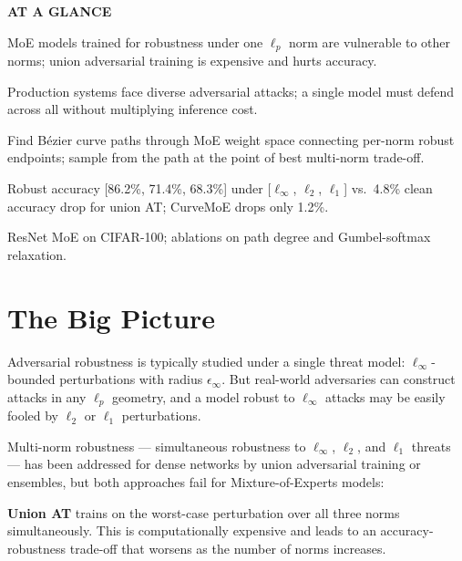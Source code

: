 \documentclass[10pt,twocolumn]{article}
\begin{document}
\begin{mdframed}[backgroundcolor=boxgray,linecolor=rulered,linewidth=1pt,
    innerleftmargin=6pt,innerrightmargin=6pt,
    innertopmargin=6pt,innerbottommargin=6pt]
\textbf{\small AT A GLANCE}\par\vspace{4pt}
\begin{description}[leftmargin=0pt,labelsep=4pt,itemsep=2pt,parsep=0pt,
    font=\small\bfseries]
  \item[Problem:] MoE models trained for robustness under one $\ell_p$
    norm are vulnerable to other norms; union adversarial training is
    expensive and hurts accuracy.
  \item[Why it matters:] Production systems face diverse adversarial
    attacks; a single model must defend across all without multiplying
    inference cost.
  \item[Method:] Find Bézier curve paths through MoE weight space
    connecting per-norm robust endpoints; sample from the path at the
    point of best multi-norm trade-off.
  \item[Result:] Robust accuracy [86.2\%, 71.4\%, 68.3\%] under
    [$\ell_\infty$, $\ell_2$, $\ell_1$] vs.\ 4.8\% clean accuracy drop
    for union AT; CurveMoE drops only 1.2\%.
  \item[Evidence:] ResNet MoE on CIFAR-100; ablations on path degree
    and Gumbel-softmax relaxation.
\end{description}
\end{mdframed}

\section{The Big Picture}

Adversarial robustness is typically studied under a single threat model:
$\ell_\infty$-bounded perturbations with radius $\epsilon_\infty$. But
real-world adversaries can construct attacks in any $\ell_p$ geometry,
and a model robust to $\ell_\infty$ attacks may be easily fooled by
$\ell_2$ or $\ell_1$ perturbations.

Multi-norm robustness — simultaneous robustness to $\ell_\infty$,
$\ell_2$, and $\ell_1$ threats — has been addressed for dense networks
by union adversarial training or ensembles, but both approaches fail for
Mixture-of-Experts models:

\textbf{Union AT} trains on the worst-case perturbation over all three
norms simultaneously. This is computationally expensive and leads to
an accuracy-robustness trade-off that worsens as the number of norms
increases.
\end{document}
